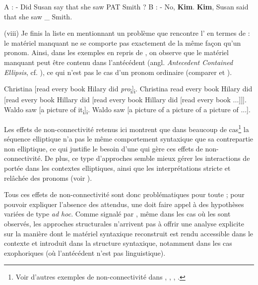 \ea
\ea  A : - Did Susan say that she saw PAT Smith ? B : - No, \textbf{Kim}. 
\ex  *\textbf{Kim}, Susan said that she saw \_ Smith. \label{ch1:ex139b} 
\z
\z

(viii) Je finis la liste en mentionnant un problème que rencontre l’ en termes de  : le matériel manquant ne se comporte pas exactement de la même façon qu’un pronom. Ainsi, dans les exemples en  repris de \citet{Aelbrecht2009}, on observe que le matériel manquant peut être contenu dans l’antécédent (angl. \textit{Antecedent Contained Ellipsis}, cf. \citealt{Sag1976}), ce qui n’est pas le cas d’un pronom ordinaire (comparer  et ). 


\ea \label{ch1:ex140}
\ea  Christina [read every book Hilary did \textit{pro}\textsubscript{i}]\textsubscript{i}. \label{ch1:ex140a}
\ex  *Christina read every book Hilary did [read every book Hillary did [read every book Hillary did [read every book ...]]].
\ex  *Waldo saw [a picture of it\textsubscript{i}]\textsubscript{i}. \label{ch1:ex140c}
\ex  *Waldo saw [a picture of a picture of a picture of ...].
\z
\z

Les effets de non-connectivité retenus ici montrent que dans beaucoup de cas\footnote{Voir d’autres exemples de non-connectivité dans \citet{Stainton2006}, \citet{Ginzburg2012}, \citet{Nykiel2013}, \citet{GinzburgEtAlToAppear}.} la séquence elliptique n’a pas le même comportement syntaxique que sa contrepartie non elliptique, ce qui justifie le besoin d’une  qui gère ces effets de non-connectivité. De plus, ce type d’approches semble mieux gérer les interactions de portée dans les contextes elliptiques, ainsi que les interprétations stricte et relâchée des pronoms (voir \citealt{DalrympleEtAl1991}). 

Tous ces effets de non-connectivité sont donc problématiques pour toute  ; pour pouvoir expliquer l’absence des  attendus, une  doit faire appel à des hypothèses variées de type \textit{ad hoc}. Comme signalé par \citet{GinzburgEtAlToAppear}, même dans les cas où les  sont observés, les approches structurales n’arrivent pas à offrir une analyse explicite sur la manière dont le matériel syntaxique reconstruit est rendu accessible dans le contexte et introduit dans la structure syntaxique, notamment dans les cas exophoriques (où l’antécédent n’est pas linguistique). 

